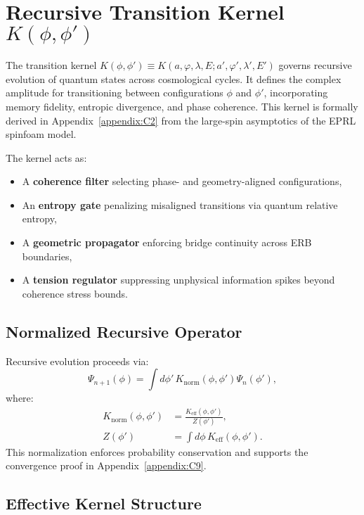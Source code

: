\section{Recursive Transition Kernel \( K(\phi,\phi') \)}
\label{sec:kernel}

The transition kernel \( K(\phi,\phi') \equiv K(a,\varphi,\lambda,E; a',\varphi',\lambda',E') \) governs recursive evolution of quantum states across cosmological cycles. It defines the complex amplitude for transitioning between configurations \( \phi \) and \( \phi' \), incorporating memory fidelity, entropic divergence, and phase coherence. This kernel is formally derived in Appendix~\ref{appendix:C2} from the large-spin asymptotics of the EPRL spinfoam model.

The kernel acts as:
\begin{itemize}
    \item A \textbf{coherence filter} selecting phase- and geometry-aligned configurations,
    \item An \textbf{entropy gate} penalizing misaligned transitions via quantum relative entropy,
    \item A \textbf{geometric propagator} enforcing bridge continuity across ERB boundaries,
    \item A \textbf{tension regulator} suppressing unphysical information spikes beyond coherence stress bounds.
\end{itemize}

\subsection{Normalized Recursive Operator}
\label{subsec:normalized-kernel}

Recursive evolution proceeds via:
\begin{equation}
\Psi_{n+1}(\phi) = \int d\phi' \, K_{\text{norm}}(\phi, \phi') \Psi_n(\phi'),
\end{equation}
where:
\begin{align}
K_{\text{norm}}(\phi, \phi') &= \frac{K_{\text{eff}}(\phi, \phi')}{Z(\phi')}, \\
Z(\phi') &= \int d\phi \, K_{\text{eff}}(\phi, \phi').
\end{align}
This normalization enforces probability conservation and supports the convergence proof in Appendix~\ref{appendix:C9}.

\subsection{Effective Kernel Structure}
\label{subsec:effective-kernel}


